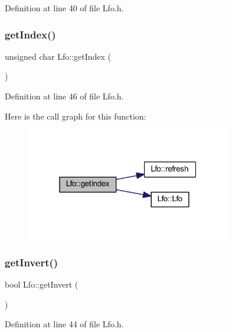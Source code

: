 Definition at line 40 of file Lfo.\+h.

\mbox{\label{class_lfo_a007a56fbcb5a5cf639dc397d35d6392f}} 
\subsubsection{\texorpdfstring{get\+Index()}{getIndex()}}
{\footnotesize\ttfamily unsigned char Lfo\+::get\+Index (\begin{DoxyParamCaption}{ }\end{DoxyParamCaption})\hspace{0.3cm}{\ttfamily [inline]}}



Definition at line 46 of file Lfo.\+h.

Here is the call graph for this function\+:
\nopagebreak
\begin{figure}[H]
\begin{center}
\leavevmode
\includegraphics[width=253pt]{class_lfo_a007a56fbcb5a5cf639dc397d35d6392f_cgraph}
\end{center}
\end{figure}
\mbox{\label{class_lfo_af55fdb8ee75c2da369056a1b0720fe41}} 
\subsubsection{\texorpdfstring{get\+Invert()}{getInvert()}}
{\footnotesize\ttfamily bool Lfo\+::get\+Invert (\begin{DoxyParamCaption}{ }\end{DoxyParamCaption})\hspace{0.3cm}{\ttfamily [inline]}}



Definition at line 44 of file Lfo.\+h.


